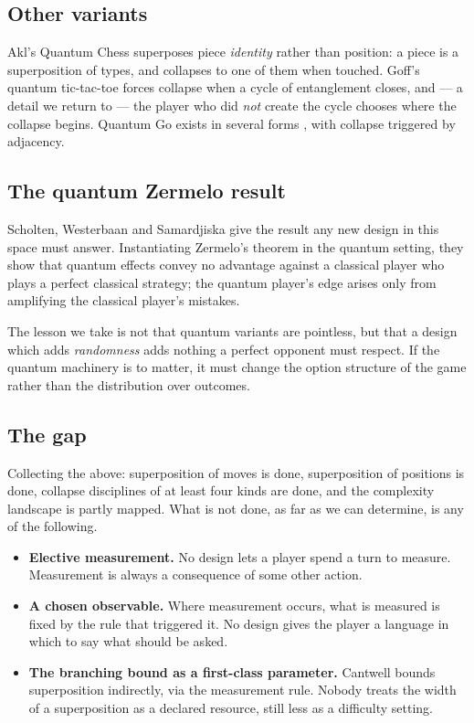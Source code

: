 \documentclass[11pt,a4paper]{article}
\theoremstyle{definition}
\theoremstyle{plain}
\begin{document}
\subsection{Other variants}

Akl's Quantum Chess \cite{akl2010} superposes piece \emph{identity} rather than
position: a piece is a superposition of types, and collapses to one of them
when touched. Goff's quantum tic-tac-toe \cite{goff2006} forces collapse when a
cycle of entanglement closes, and --- a detail we return to --- the player who
did \emph{not} create the cycle chooses where the collapse begins. Quantum Go
exists in several forms \cite{quantumgo2020}, with collapse triggered by
adjacency.

\subsection{The quantum Zermelo result}

Scholten, Westerbaan and Samardjiska \cite{scholten2026} give the result any
new design in this space must answer. Instantiating Zermelo's theorem in the
quantum setting, they show that quantum effects convey no advantage against a
classical player who plays a perfect classical strategy; the quantum player's
edge arises only from amplifying the classical player's mistakes.

The lesson we take is not that quantum variants are pointless, but that a
design which adds \emph{randomness} adds nothing a perfect opponent must
respect. If the quantum machinery is to matter, it must change the option
structure of the game rather than the distribution over outcomes.

\subsection{The gap}

Collecting the above: superposition of moves is done, superposition of
positions is done, collapse disciplines of at least four kinds are done, and
the complexity landscape is partly mapped. What is not done, as far as we can
determine, is any of the following.

\begin{itemize}[leftmargin=1.4em]
\item \textbf{Elective measurement.} No design lets a player spend a turn to
      measure. Measurement is always a consequence of some other action.
\item \textbf{A chosen observable.} Where measurement occurs, what is measured
      is fixed by the rule that triggered it. No design gives the player a
      language in which to say what should be asked.
\item \textbf{The branching bound as a first-class parameter.} Cantwell bounds
      superposition indirectly, via the measurement rule. Nobody treats the
      width of a superposition as a declared resource, still less as a
      difficulty setting.
\end{itemize}
\end{document}

